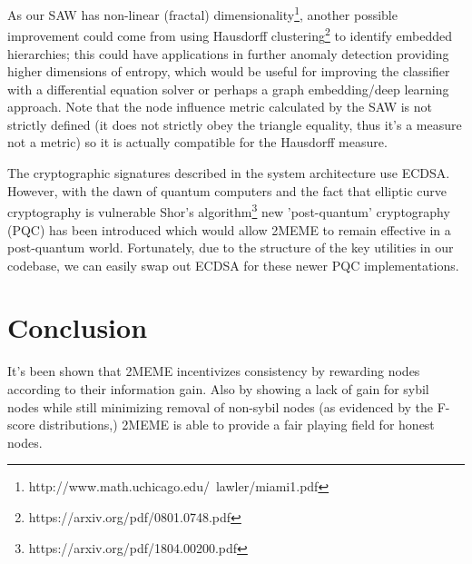 \documentclass{article}
\begin{document}
	As our SAW has non-linear (fractal) dimensionality\footnote{http://www.math.uchicago.edu/~lawler/miami1.pdf}, another possible improvement could come from using Hausdorff clustering\footnote{https://arxiv.org/pdf/0801.0748.pdf} to identify embedded hierarchies; this could have applications in further anomaly detection providing higher dimensions of entropy, which would be useful for improving the classifier with a differential equation solver or perhaps a graph embedding/deep learning approach. Note that the node influence metric calculated by the SAW is not strictly defined (it does not strictly obey the triangle equality, thus it's a measure not a metric) so it is actually compatible for the Hausdorff measure. 
	
	The cryptographic signatures described in the system architecture use ECDSA. However, with the dawn of quantum computers and the fact that elliptic curve cryptography is vulnerable Shor's algorithm\footnote{https://arxiv.org/pdf/1804.00200.pdf} new 'post-quantum' cryptography (PQC) has been introduced which would allow 2MEME to remain effective in a post-quantum world. Fortunately, due to the structure of the key utilities in our codebase, we can easily swap out ECDSA for these newer PQC implementations. 

	
\section{Conclusion}
It's been shown that 2MEME incentivizes consistency by rewarding nodes according to their information gain. Also by showing a lack of gain for sybil nodes while still minimizing removal of non-sybil nodes (as evidenced by the F-score distributions,) 2MEME is able to provide a fair playing field for honest nodes.
	
	
\end{document}
